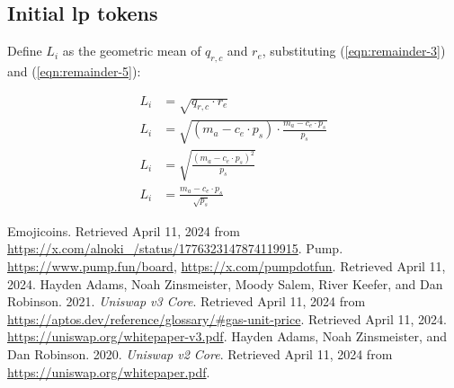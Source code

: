 \documentclass[table, twocolumn]{article}
\begin{document}
\subsection{Initial \gls*{lp} tokens} \label{sec:initial-lp-tokens}

Define $L_i$ as the geometric mean of $q_{r, c}$ and $r_e$, substituting
(\ref{eqn:remainder-3}) and (\ref{eqn:remainder-5}):

\begin{align}
  L_i & = \sqrt{q_{r, c} \cdot r_e} \nonumber                                  \\
  L_i & =
  \sqrt{(m_a - c_e \cdot p_s) \cdot \frac{m_a - c_e \cdot p_s}{p_s}} \nonumber \\
  L_i & = \sqrt{\frac{(m_a - c_e \cdot p_s) ^ 2}{p_s}} \nonumber               \\
  L_i & =\frac{m_a - c_e \cdot p_s}{\sqrt{p_s}}\end{align}

\begin{thebibliography}{}
   Emojicoins. Retrieved April 11, 2024 from
  \url{https://x.com/alnoki_/status/1776323147874119915}.
   Pump. \url{https://www.pump.fun/board}, \url{https://x.com/pumpdotfun}.
  Retrieved April 11, 2024.
   Hayden Adams, Noah Zinsmeister, Moody Salem, River Keefer, and Dan
  Robinson. 2021. \emph{Uniswap v3 Core}. Retrieved April 11, 2024 from
   \url{https://aptos.dev/reference/glossary/#gas-unit-price}. Retrieved
  April 11, 2024.
  \url{https://uniswap.org/whitepaper-v3.pdf}.
   Hayden Adams, Noah Zinsmeister, and Dan Robinson. 2020. \emph{Uniswap
    v2 Core}. Retrieved April 11, 2024 from \url{https://uniswap.org/whitepaper.pdf}.
\end{thebibliography}
\end{document}
